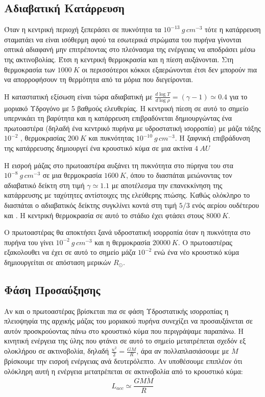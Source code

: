 \subsection{Αδιαβατική Κατάρρευση}
Όταν η κεντρική περιοχή ξεπεράσει σε πυκνότητα τα $10^{-13} \ g \, cm^{-3}$ τότε η κατάρρευση σταματάει να είναι ισόθερμη αφού τα εσωτερικά στρώματα του πυρήνα γίνονται οπτικά αδιαφανή μην επιτρέποντας στο πλεόνασμα της ενέργειας να αποδράσει μέσω της ακτινοβολίας. Έτσι η κεντρική θερμοκρασία και η πίεση αυξάνονται.
Στη θερμοκρασία των $1000 \ K$ οι περισσότεροι κόκκοι εξαερώνονται έτσι δεν μπορούν πια να απορροφήσουν τη θερμότητα από τα μόρια που διεγείρονται.


Η καταστατική εξίσωση είναι τώρα αδιαβατική με $\frac{d \log T}{d \log \rho} = (\gamma-1) \simeq 0.4$ για το μοριακό Υδρογόνο με 5 βαθμούς ελευθερίας. Η κεντρική πίεση σε αυτό το σημείο υπερνικάει τη βαρύτητα και η κατάρρευση επιβραδύνεται δημιουργώντας ένα πρωτοαστέρα (δηλαδή ένα κεντρικό πυρήνα με υδροστατική ισορροπία) με μάζα τάξης $10^{-2}$ \sm, θερμοκρασίας $200 \ K$ και πυκνότητας $10^{-10} \ g \, cm^{-3}$.
Η ξαφνική επιβράδυνση της κατάρρευσης δημιουργεί ένα κρουστικό κύμα σε μια ακτίνα $4 \ AU$


Η εισροή μάζας στο πρωτοαστέρα αυξάνει τη πυκνότητα στο πύρηνα του στα $10^{-8} \ g \, cm^{-3}$ σε μια θερμοκρασία $1600 \ K$, όπου το  διασπάται μειώνοντας τον αδιαβατικό δείκτη στη τιμή $\gamma \simeq 1.1$ με αποτέλεσμα την επανεκκίνηση της κατάρρευσης με ταχύτητες αντίστοιχες της ελεύθερης πτώσης. Καθώς ολόκληρο το  διασπάται ο αδιαβατικός δείκτης συγκλίνει κοντά στη τιμή $5/3$ ενός αερίου ουδέτερου  και . Η κεντρική θερμοκρασία σε αυτό το στάδιο έχει φτάσει στους $8000 \ K$.


Ο πρωτοαστέρας θα αποκτήσει ξανά υδροστατική ισορροπία όταν η πυκνότητα στο πυρήνα του γίνει $10^{-2} \ g \, cm^{-3}$ και η θερμοκρασία $20000 \ K$. Ο πρωτοαστέρας εξακολουθει να έχει σε αυτό το σημείο μάζα $10^{-2}$ \sm ενώ ένα νέο κρουστικό κύμα δημιουργείται σε απόσταση μερικών $R_{\odot}$. 


\subsection{Φάση Προσαύξησης}
Αν και ο πρωτοαστέρας βρίσκεται πια σε φάση Υδροστατικής ισορροπίας η πλειοψηφία της αρχικής μάζας του μοριακού πυρήνα συνεχίζει να προσαυξάνεται σε αυτόν προσκρούοντας πάνω στο κρουστικό κύμα που περιγράψαμε παραπάνω. 
Η κινητική ενέργεια της ύλης που φτάνει σε αυτό το σημείο μετατρέπεται σχεδόν εξ ολοκλήρου σε ακτινοβολία, δηλαδή $\frac{u^2}{2}=\frac{GM}{R}$, άρα αν πολλαπλασιάσουμε με $\dot{M}$ βρίσκουμε την εισροή ενέργειας ανά δευτερόλεπτο. Αν υποθέσουμε επιπλέον ότι ολόκληρη αυτή η ενέργεια μετατρέπεται σε ακτινοβολία από το κρουστικό κύμα: 
\begin{equation}
L_{acc} \simeq \frac{GM\dot{M}}{R}
\end{equation}


